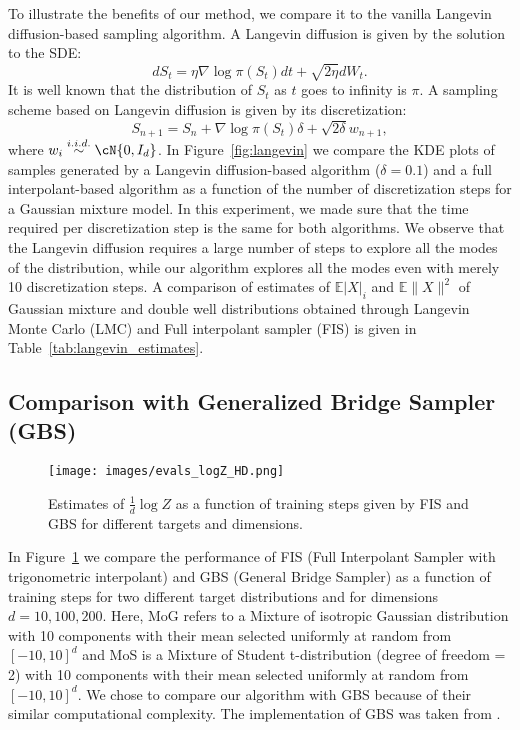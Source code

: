 To illustrate the benefits of our method, we compare it to the vanilla Langevin diffusion-based sampling algorithm. A Langevin diffusion is given by the solution to the SDE:
\begin{equation*}
    dS_t = \eta\nabla\log\pi(S_t)dt + \sqrt{2\eta} dW_t.
\end{equation*}
 It is well known that the distribution of $S_t$ as $t$ goes to infinity is $\pi$. A sampling scheme based on Langevin diffusion is given by its discretization:
 \begin{equation*}
     S_{n+1} = S_n + \nabla\log\pi(S_t)\delta + \sqrt{2\delta}w_{n+1},
 \end{equation*}
 where $w_i\overset{i.i.d.}{\sim}\cN{0,I_d}$. In Figure~\ref{fig:langevin} we compare the KDE plots of samples generated by a Langevin diffusion-based algorithm ($\delta=0.1$) and a full interpolant-based algorithm as a function of the number of discretization steps for a Gaussian mixture model. In this experiment, we made sure that the time required per discretization step is the same for both algorithms. We observe that the Langevin diffusion requires a large number of steps to explore all the modes of the distribution, while our algorithm explores all the modes even with merely 10 discretization steps. A comparison of estimates of $\mathbb{E}|X|_i$ and $\mathbb{E}\|X\|^2$ of Gaussian mixture and double well distributions obtained through Langevin Monte Carlo (LMC) and Full interpolant sampler (FIS) is given in Table~\ref{tab:langevin_estimates}.
\subsection{Comparison with Generalized Bridge Sampler (GBS)}\label{sec:comparison_gbs}
\begin{figure}
  \centering
  \texttt{[image: images/evals\_logZ\_HD.png]}
  \caption{Estimates of $\frac{1}{d}\log Z$ as a function of training steps given by FIS and GBS for different targets and dimensions. }
  \label{fig:gbs_comp_plot}
\end{figure}

In Figure~\ref{fig:gbs_comp_plot} we compare the performance of FIS (Full Interpolant Sampler with trigonometric interpolant) and GBS (General Bridge Sampler) \cite{richter_improved_2023, blessing_beyond_2024} as a function of training steps for two different target distributions and for dimensions $d=10,100,200$. Here, MoG refers to a Mixture of isotropic Gaussian distribution with 10 components with their mean selected uniformly at random from $[-10,10]^d$ and MoS is a Mixture of Student t-distribution (degree of freedom = 2) with 10 components with their mean selected uniformly at random from $[-10,10]^d$. We chose to compare our algorithm with GBS because of their similar computational complexity. The implementation of GBS was taken from \cite{blessing_beyond_2024}.

